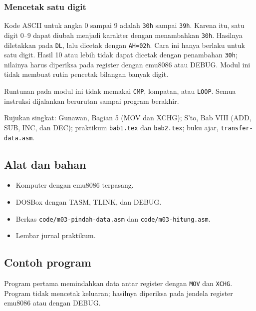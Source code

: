 \subsubsection*{Mencetak satu digit}

Kode ASCII untuk angka 0 sampai 9 adalah \texttt{30h} sampai
\texttt{39h}. Karena itu, satu digit 0--9 dapat diubah menjadi
karakter dengan menambahkan \texttt{30h}. Hasilnya diletakkan pada
\texttt{DL}, lalu dicetak dengan \texttt{AH=02h}. Cara ini hanya
berlaku untuk satu digit. Hasil 10 atau lebih tidak dapat dicetak
dengan penambahan \texttt{30h}; nilainya harus diperiksa pada
register dengan emu8086 atau DEBUG. Modul ini tidak membuat rutin
pencetak bilangan banyak digit.

Runtunan pada modul ini tidak memakai \texttt{CMP}, lompatan, atau
\texttt{LOOP}. Semua instruksi dijalankan berurutan sampai program
berakhir.

\begin{rujukan}
Rujukan singkat: Gunawan, Bagian 5 (MOV dan XCHG); S'to, Bab VIII
(ADD, SUB, INC, dan DEC); praktikum \texttt{bab1.tex} dan
\texttt{bab2.tex}; buku ajar, \texttt{transfer-data.asm}.
\end{rujukan}

\subsection{Alat dan bahan}

\begin{itemize}
    \item Komputer dengan emu8086 terpasang.
    \item DOSBox dengan TASM, TLINK, dan DEBUG.
    \item Berkas \texttt{code/m03-pindah-data.asm} dan
          \texttt{code/m03-hitung.asm}.
    \item Lembar jurnal praktikum.
\end{itemize}

\subsection{Contoh program}

Program pertama memindahkan data antar register dengan \texttt{MOV}
dan \texttt{XCHG}. Program tidak mencetak keluaran; hasilnya
diperiksa pada jendela register emu8086 atau dengan DEBUG.



